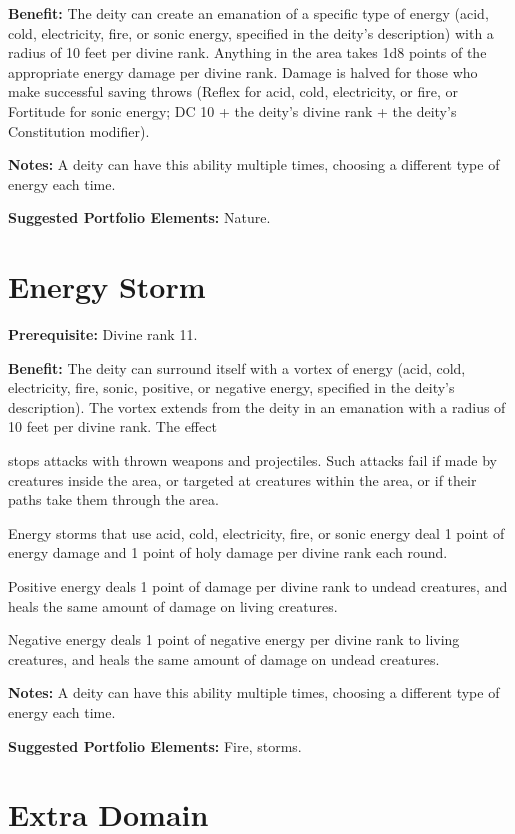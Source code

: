 \documentclass{article}
\begin{document}
\textbf{Benefit:} The deity can create an emanation of a specific type of energy 
(acid, cold, electricity, fire, or sonic energy, specified in the deity's description) 
with a radius of 10 feet per divine rank. Anything in the area takes 1d8 points 
of the appropriate energy damage per divine rank. Damage is halved for those who 
make successful saving throws (Reflex for acid, cold, electricity, or fire, or 
Fortitude for sonic energy; DC 10 + the deity's divine rank + the deity's Constitution 
modifier).

\textbf{Notes:} A deity can have this ability multiple times, choosing a different 
type of energy each time.

\textbf{Suggested Portfolio Elements:} Nature.

\vspace{12pt}
\section*{Energy Storm}

\textbf{Prerequisite:} Divine rank 11.

\textbf{Benefit:} The deity can surround itself with a vortex of energy (acid, 
cold, electricity, fire, sonic, positive, or negative energy, specified in the 
deity's description). The vortex extends from the deity in an emanation with a 
radius of 10 feet per divine rank. The effect

stops attacks with thrown weapons and projectiles. Such attacks fail if made by 
creatures inside the area, or targeted at creatures within the area, or if their 
paths take them through the area.

Energy storms that use acid, cold, electricity, fire, or sonic energy deal 1 point 
of energy damage and 1 point of holy damage per divine rank each round.

Positive energy deals 1 point of damage per divine rank to undead creatures, and 
heals the same amount of damage on living creatures.

Negative energy deals 1 point of negative energy per divine rank to living creatures, 
and heals the same amount of damage on undead creatures.

\textbf{Notes:} A deity can have this ability multiple times, choosing a different 
type of energy each time.

\textbf{Suggested Portfolio Elements:} Fire, storms.

\vspace{12pt}
\section*{Extra Domain}
\end{document}
